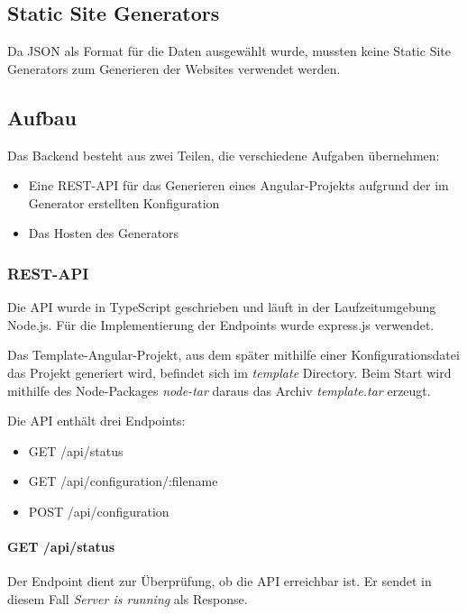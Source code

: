 \subsection{Static Site Generators}
Da JSON als Format für die Daten ausgewählt wurde, mussten keine Static Site Generators zum Generieren der
Websites verwendet werden.


\subsection{Aufbau}
Das Backend besteht aus zwei Teilen, die verschiedene Aufgaben übernehmen:

\begin{itemize}
    \item Eine REST-API für das Generieren eines Angular-Projekts aufgrund der im Generator erstellten Konfiguration
    \item Das Hosten des Generators
\end{itemize}

\subsubsection{REST-API}
Die API wurde in TypeScript geschrieben und läuft in der Laufzeitumgebung Node.js.
Für die Implementierung der Endpoints wurde express.js verwendet.

Das Template-Angular-Projekt, aus dem später mithilfe einer Konfigurationsdatei das Projekt generiert wird,
befindet sich im \textit{template} Directory.
Beim Start wird mithilfe des Node-Packages \textit{node-tar} daraus das Archiv \textit{template.tar} erzeugt.

Die API enthält drei Endpoints:

\begin{itemize}
    \item GET /api/status
    \item GET /api/configuration/:filename
    \item POST /api/configuration
\end{itemize}

\paragraph{GET /api/status}
Der Endpoint dient zur Überprüfung, ob die API erreichbar ist.
Er sendet in diesem Fall \textit{Server is running} als Response.

